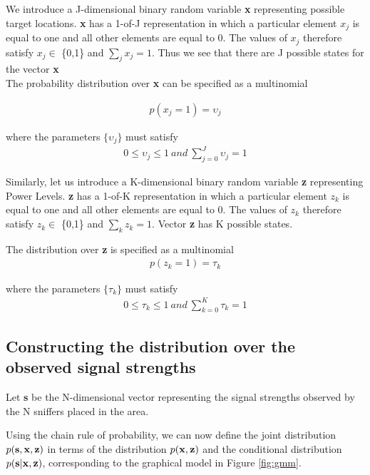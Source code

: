 \documentclass{Localization-PaperWriteupDraft}
\begin{document}
We introduce a J-dimensional binary random variable {\bf x} representing possible target locations. {\bf x} has a 1-of-J representation in which a particular element $x_{j}$ is equal to one and all other elements are equal to 0. The values of $x_{j}$ therefore satisfy $x_{j} \in$ \{0,1\} and $\sum_{j} x_{j} = 1$. Thus we see that there are J possible states for the vector {\bf x} \\

The probability distribution over {\bf x} can be specified as a multinomial 

\begin{align}
 p(x_{j} = 1) = \upsilon_{j}
\end{align}

where the parameters $\{\upsilon_{j}\}$ must satisfy
\begin{align}
0 \le \upsilon_{j} \le 1 \ and \ \sum_{j=0}^{J} \upsilon_{j} = 1
\end{align}

Similarly, let us introduce a K-dimensional binary random variable {\bf z} representing Power Levels. {\bf z} has a 1-of-K representation in which a particular element $z_{k}$ is equal to one and all other elements are equal to 0. The values of $z_{k}$ therefore satisfy $z_{k} \in$ \{0,1\} and $\sum_{k} z_{k} = 1$. Vector {\bf z} has K possible states.

The distribution over {\bf z} is specified as a multinomial 
\begin{align}
p(z_{k} = 1) = \tau_{k}
\end{align}

where the parameters $\{\tau_{k}\}$ must satisfy
\begin{align}
0 \le \tau_{k} \le 1 \ and \  \sum_{k=0}^{K} \tau_{k} = 1
\end{align}

\subsection{Constructing the distribution over the observed signal strengths}
\label{subsec:constructingthedistributionovertheobservedsignalstrengths}

Let {\bf s} be the N-dimensional vector representing the signal strengths observed by the N sniffers placed in the area. 

Using the chain rule of probability, we can now define the joint distribution $p( {\bf s}, {\bf x}, {\bf z})$ in terms of the distribution $p( {\bf x}, {\bf z})$ and the conditional distribution $p( {\bf s} | {\bf x}, {\bf z})$, corresponding to the graphical model in Figure \ref{fig:gmm}.
\end{document}
